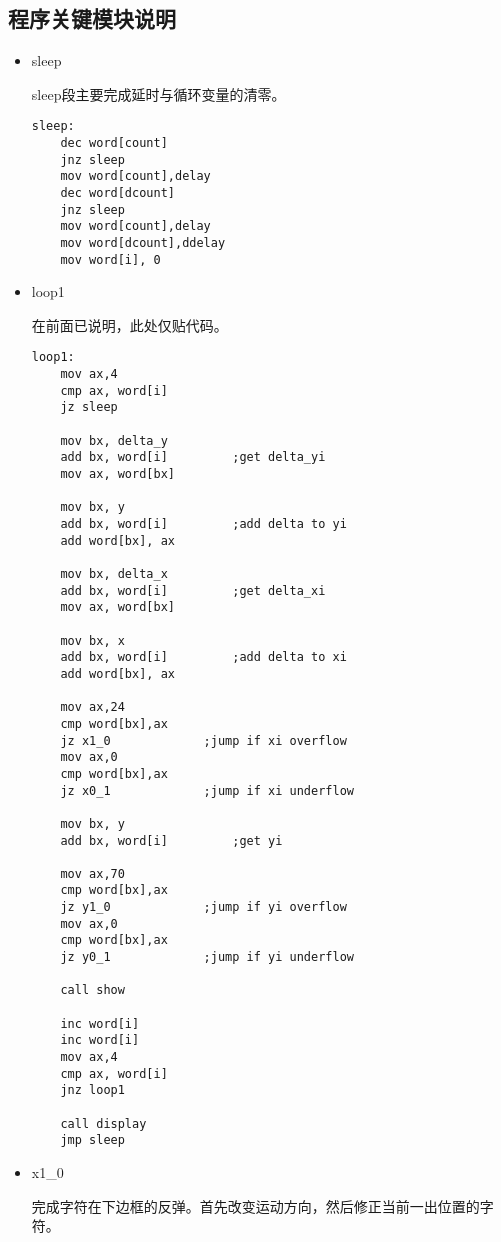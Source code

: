 \documentclass[a4paper,11pt,UTF8]{ctexart}
\begin{document}
\subsection{程序关键模块说明}
	\begin{itemize}
		\item sleep
		
		sleep段主要完成延时与循环变量的清零。
		\clearpage
			\begin{lstlisting}[caption={SStone\_beta.asm sleep段},tabsize=4,basicstyle=\footnotesize,captionpos=b]
sleep:
	dec word[count]			
	jnz sleep				
	mov word[count],delay
	dec word[dcount]			
	jnz sleep
	mov word[count],delay
	mov word[dcount],ddelay	
	mov word[i], 0
			\end{lstlisting}

	
		\item loop1
		
		在前面已说明，此处仅贴代码。
		\begin{lstlisting}[caption={SStone\_beta.asm loop1段}, basicstyle=\footnotesize,tabsize=4,captionpos=b]
loop1:
	mov ax,4		
	cmp ax, word[i]
	jz sleep
	
	mov bx, delta_y         
	add bx, word[i]			;get delta_yi
	mov ax, word[bx]		
	
	mov bx, y			
	add bx, word[i]			;add delta to yi
	add word[bx], ax		
	
	mov bx, delta_x			
	add bx, word[i]			;get delta_xi
	mov ax, word[bx]		
	
	mov bx, x				
	add bx, word[i]			;add delta to xi
	add word[bx], ax		
	
	mov ax,24               
	cmp word[bx],ax			
	jz x1_0				;jump if xi overflow
	mov ax,0				
	cmp word[bx],ax			
	jz x0_1				;jump if xi underflow
	
	mov bx, y				
	add bx, word[i]			;get yi
	
	mov ax,70				
	cmp word[bx],ax			
	jz y1_0				;jump if yi overflow
	mov ax,0				
	cmp word[bx],ax			
	jz y0_1				;jump if yi underflow
	
	call show
	
	inc word[i]
	inc word[i]
	mov ax,4		
	cmp ax, word[i]
	jnz loop1
	
	call display
	jmp sleep
		\end{lstlisting}
	
	\item x1\_0
	
	完成字符在下边框的反弹。首先改变运动方向，然后修正当前一出位置的字符。
	

\end{itemize}
\end{document}
